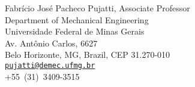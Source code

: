 \documentclass[letterpaper, 11pt, oneside]{memoir}
\begin{document}
\noindent
Fabrício José Pacheco Pujatti, Associate Professor\\
Department of Mechanical Engineering\\
Universidade Federal de Minas Gerais\\
Av. Antônio Carlos, 6627\\
Belo Horizonte, MG, Brazil, CEP 31.270-010\\
\texttt{\href{mailto:pujatti@demec.ufmg.br}{pujatti@demec.ufmg.br}}\\
+55~(31)~3409-3515
\end{document}
